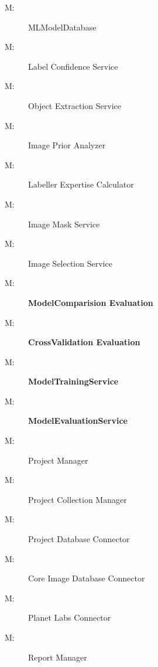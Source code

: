 \documentclass[12pt, titlepage]{article}
\newcounter{mnum}
\newcommand{\mthemnum}{M\themnum}
\begin{document}
\begin{description}
  \item [ \mthemnum \label{mlmodeldatabase}:]
    MLModelDatabase
\item [ \mthemnum \label{Label Confidence Service}:]Label Confidence Service
\item [ \mthemnum \label{Object Extraction Service}:]Object Extraction Service
\item [ \mthemnum \label{Image Prior Analyzer}:]Image Prior Analyzer
\item [ \mthemnum \label{Labeller Expertise Calculator}:]Labeller Expertise Calculator
\item [ \mthemnum \label{Image Mask Service}:]Image Mask Service
\item [ \mthemnum \label{Image Selection Service}:]Image Selection Service
  \item [ \mthemnum \label{modelcomparison}:]
    \textbf{ModelComparision Evaluation}

  \item [ \mthemnum \label{crossvalidation}:]
    \textbf{CrossValidation Evaluation}

  \item [ \mthemnum \label{modeltrainingservice}:]
    \textbf{ModelTrainingService}

  \item [ \mthemnum \label{modelevaluationservice}:]
    \textbf{ModelEvaluationService}

\item [ \mthemnum \label{pm}:]
Project Manager
\item [ \mthemnum \label{pcm}:]
Project Collection Manager
\item [ \mthemnum \label{pdbc}:]
Project Database Connector
\item [ \mthemnum \label{cidbc}:]
Core Image Database Connector
\item [ \mthemnum \label{plbsc}:]
Planet Labs Connector
\item [ \mthemnum \label{rm}:]
Report Manager

\end{description}


  
\end{document}
